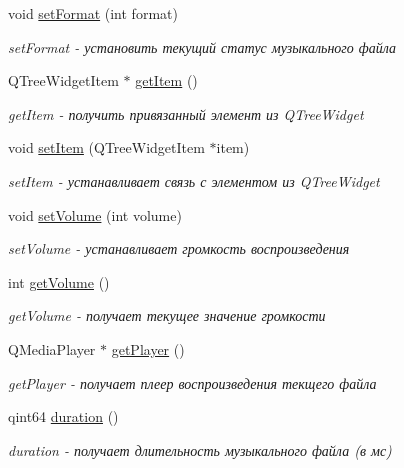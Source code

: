 \begin{DoxyCompactItemize}
void \hyperlink{class_key_element_aaee575ca9fabebd253806da9dcdc512f}{set\+Format} (int format)
\begin{DoxyCompactList}\small\item\em set\+Format -\/ установить текущий статус музыкального файла \end{DoxyCompactList}\item 
Q\+Tree\+Widget\+Item $\ast$ \hyperlink{class_key_element_aa4180885b87bb3eb0ed7418a96b79ffc}{get\+Item} ()
\begin{DoxyCompactList}\small\item\em get\+Item -\/ получить привязанный элемент из Q\+Tree\+Widget \end{DoxyCompactList}\item 
void \hyperlink{class_key_element_ab05c8efbfa5efad73e4e3b46d1521336}{set\+Item} (Q\+Tree\+Widget\+Item $\ast$item)
\begin{DoxyCompactList}\small\item\em set\+Item -\/ устанавливает связь с элементом из Q\+Tree\+Widget \end{DoxyCompactList}\item 
void \hyperlink{class_key_element_ae702f4dcd7becbce1737e6f4f3f69afe}{set\+Volume} (int volume)
\begin{DoxyCompactList}\small\item\em set\+Volume -\/ устанавливает громкость воспроизведения \end{DoxyCompactList}\item 
int \hyperlink{class_key_element_a088397040b8daccb6c7f5cd6cc8ef29f}{get\+Volume} ()
\begin{DoxyCompactList}\small\item\em get\+Volume -\/ получает текущее значение громкости \end{DoxyCompactList}\item 
Q\+Media\+Player $\ast$ \hyperlink{class_key_element_ae961bfbc0ce3eeb9b62ad12100ca977f}{get\+Player} ()
\begin{DoxyCompactList}\small\item\em get\+Player -\/ получает плеер воспроизведения текщего файла \end{DoxyCompactList}\item 
qint64 \hyperlink{class_key_element_a30c837b84299e75fcd41e0c6544d86ad}{duration} ()
\begin{DoxyCompactList}\small\item\em duration -\/ получает длительность музыкального файла (в мс) \end{DoxyCompactList}\item 

\end{DoxyCompactItemize}
